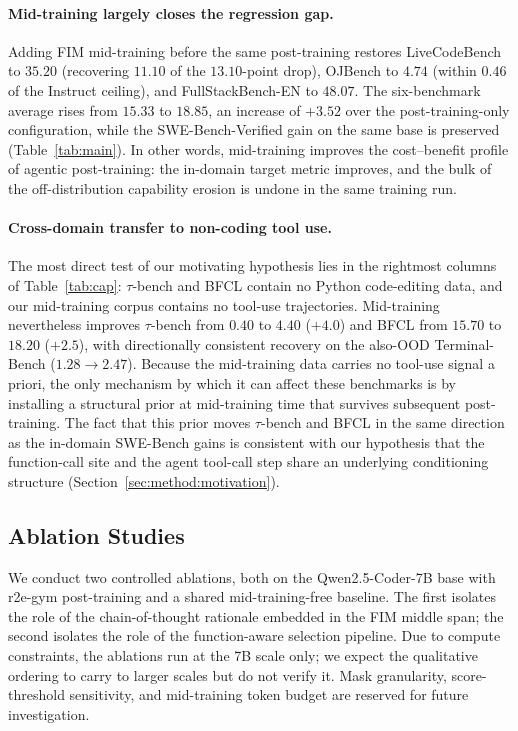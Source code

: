 \paragraph{Mid-training largely closes the regression gap.}
Adding FIM mid-training before the same post-training restores
LiveCodeBench to $35.20$ (recovering $11.10$ of the $13.10$-point drop),
OJBench to $4.74$ (within $0.46$ of the Instruct ceiling), and
FullStackBench-EN to $48.07$. The six-benchmark average rises from
$15.33$ to $18.85$, an increase of $+3.52$ over the post-training-only
configuration, while the SWE-Bench-Verified gain on the same base is
preserved (Table~\ref{tab:main}). In other words, mid-training improves
the cost--benefit profile of agentic post-training: the in-domain target
metric improves, and the bulk of the off-distribution capability erosion
is undone in the same training run.

\paragraph{Cross-domain transfer to non-coding tool use.}
The most direct test of our motivating hypothesis lies in the rightmost
columns of Table~\ref{tab:cap}: $\tau$-bench and BFCL contain no Python
code-editing data, and our mid-training corpus contains no tool-use
trajectories. Mid-training nevertheless improves $\tau$-bench from
$0.40$ to $4.40$ ($+4.0$) and BFCL from $15.70$ to $18.20$ ($+2.5$),
with directionally consistent recovery on the also-OOD Terminal-Bench
($1.28\!\to\!2.47$). Because the mid-training data carries no tool-use
signal a priori, the only mechanism by which it can affect these
benchmarks is by installing a structural prior at mid-training time that
survives subsequent post-training. The fact that this prior moves
$\tau$-bench and BFCL in the same direction as the in-domain SWE-Bench
gains is consistent with our hypothesis that the function-call site and
the agent tool-call step share an underlying conditioning structure
(Section~\ref{sec:method:motivation}).


\subsection{Ablation Studies}
\label{sec:exp:ablation}

We conduct two controlled ablations, both on the Qwen2.5-Coder-7B base
with r2e-gym post-training and a shared mid-training-free baseline. The
first isolates the role of the chain-of-thought rationale embedded in the
FIM middle span; the second isolates the role of the function-aware
selection pipeline. Due to compute constraints, the ablations run at the
7B scale only; we expect the qualitative ordering to carry to larger
scales but do not verify it. Mask granularity, score-threshold
sensitivity, and mid-training token budget are reserved for future
investigation.

